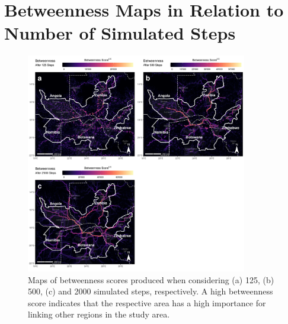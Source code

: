 \documentclass[abstract=off,10pt,a4paper,bibliography=totocnumbered]{article}
\begin{document}
\newpage
{}
\section{Betweenness Maps in Relation to Number of Simulated Steps}
\begin{figure}[hbtp]
 \begin{center}
  \includegraphics[width = 0.86\textwidth]{99_BetweennessIndividual.png}
  \caption{Maps of betweenness scores produced when considering (a) 125, (b)
   500, (c) and 2000 simulated steps, respectively. A high betweenness score
   indicates that the respective area has a high importance for linking other
   regions in the study area.}
  \label{Betweenness}
 \end{center}
\end{figure}
\restoregeometry
\newpage
\end{document}
